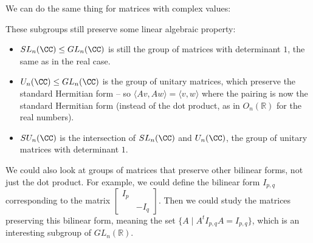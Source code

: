 We can do the same thing for matrices with complex values:
\begin{center}
\end{center}
These subgroups still preserve some linear algebraic property:
\begin{itemize}
    \item $SL_n(\CC) \leq GL_n(\CC)$ is still the group of matrices with determinant $1$, the same as in the real case. 
    \item $U_n(\CC) \leq GL_n(\CC)$ is the group of unitary matrices, which preserve the standard Hermitian form -- so $\langle Av, Aw\rangle = \langle v, w\rangle$ where the pairing is now the standard Hermitian form (instead of the dot product, as in $O_n(\mathbb{R})$ for the real numbers).  
    \item $SU_n(\CC)$ is the intersection of $SL_n(\CC)$ and $U_n(\CC)$, the group of unitary matrices with determinant $1$.
\end{itemize}
We could also look at groups of matrices that preserve other bilinear forms, not just the dot product. For example, we could define the bilinear form $I_{p,q}$ corresponding to the matrix $\begin{bmatrix} I_p & \\ & -I_q \end{bmatrix}$. 
Then we could study the matrices preserving this bilinear form, meaning the set $\{A \mid A^t I_{p,q} A = I_{p, q}\}$, which is an interesting subgroup of $GL_n(\mathbb{R})$. 

